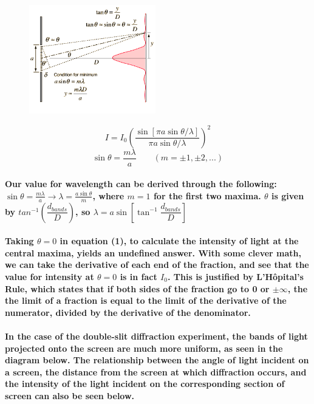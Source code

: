 \documentclass[double]{amsart}
\begin{document}
{\paragraph{}
\begin{figure}[H]
\begin{minipage}{.49\textwidth}
\centering
\includegraphics[width=5.5cm]{sinslit.png}
\end{minipage}
%
\begin{minipage}{.49\textwidth}
\begin{equation}
I = I_0 \left(\dfrac{\sin [\pi a  \sin \theta / \lambda]}{\pi a \sin \theta / \lambda}\right)^{2}
\end{equation}
\begin{equation} 
\sin\theta = \dfrac{m\lambda}{a}  \qquad (m = \pm1, \pm2, ...) 
\end{equation}
\end{minipage}
\end{figure}
\paragraph{Our value for wavelength can be derived through the following: $\sin\theta = \frac{m\lambda}{a} \rightarrow \lambda = \frac{a\sin\theta}{m}$, where $m =1$ for the first two maxima. $\theta$ is given by $tan^{-1}\left(\dfrac{d_{bands}}{D}\right)$, so $\lambda = a\sin\left[\tan^{-1}\dfrac{d_{bands}}{D}\right]$}
\newpage
\paragraph{Taking $\theta = 0$ in equation (1), to calculate the intensity of light at the central maxima, yields an undefined answer. With some clever math, we can take the derivative of each end of the fraction, and see that the value for intensity at $\theta = 0$ is in fact $I_0$. This is justified by L'H\^{o}pital's Rule, which states that if both sides of the fraction go to 0 or $\pm\infty$, the the limit of a fraction is equal to the limit of the derivative of the numerator, divided by the derivative of the denominator.}
\paragraph{In the case of the double-slit diffraction experiment, the bands of light projected onto the screen are much more uniform, as seen in the diagram below. The relationship between the angle of light incident on a screen, the distance from the screen at which diffraction occurs, and the intensity of the light incident on the corresponding section of screen can also be seen below.}}
\end{document}
